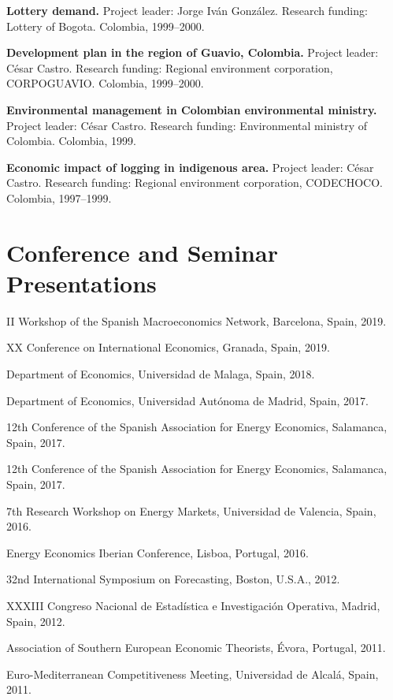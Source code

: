 \documentclass[11pt]{article}\usepackage[]{graphicx}\usepackage[]{color}
\begin{document}
 \textbf{Lottery demand.} Project leader: Jorge Iván González. Research funding: Lottery of Bogota. Colombia, 1999--2000.

 \textbf{Development plan in the region of Guavio, Colombia.} Project leader: César Castro. Research funding: Regional environment corporation, CORPOGUAVIO. Colombia, 1999--2000.

 \textbf{Environmental management in Colombian environmental ministry.} Project leader: César Castro. Research funding: Environmental ministry of Colombia. Colombia, 1999.

 \textbf{Economic impact of logging in indigenous area.} Project leader: César Castro. Research funding: Regional environment corporation, CODECHOCO. Colombia, 1997--1999.


\section{Conference and Seminar Presentations} 

II Workshop of the Spanish Macroeconomics Network, Barcelona, Spain, 2019.

 XX Conference on International Economics, Granada, Spain, 2019.
 
 Department of Economics, Universidad de Malaga, Spain, 2018.
 
 Department of Economics, Universidad Autónoma de Madrid, Spain, 2017.
 
 12th Conference of the Spanish Association for Energy Economics, Salamanca, Spain, 2017.
 
 12th Conference of the Spanish Association for Energy Economics, Salamanca, Spain, 2017.
 
 7th Research Workshop on Energy Markets, Universidad de Valencia, Spain, 2016.
 
 Energy Economics Iberian Conference, Lisboa, Portugal, 2016.
 
 32nd International Symposium on Forecasting, Boston, U.S.A., 2012.

 XXXIII Congreso Nacional de Estadística e Investigación Operativa, Madrid, Spain, 2012.
 
 Association of Southern European Economic Theorists, Évora, Portugal, 2011.

 Euro-Mediterranean Competitiveness Meeting, Universidad de Alcalá, Spain, 2011.

\end{document}
